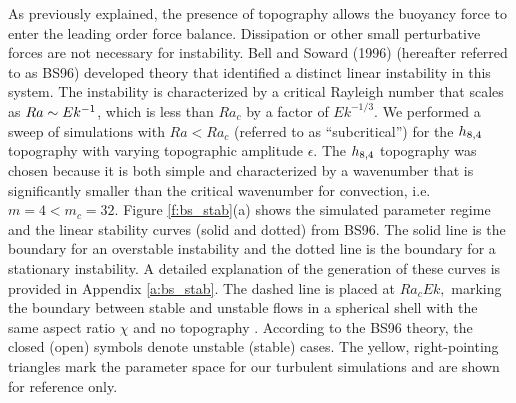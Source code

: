 As previously explained, the presence of topography allows the buoyancy force to enter the leading order force balance. 
Dissipation or other small perturbative forces are not necessary for instability. 
Bell and Soward (1996) \citep{pB96} (hereafter referred to as BS96) developed theory that identified a distinct linear instability in this system. 
The instability is characterized by a critical Rayleigh number that scales as $Ra\sim Ek^{-1}$, which is less than $Ra_c$ by a factor of $Ek^{-1/3}$. 
 We performed a sweep of simulations with $Ra <Ra_{c}$ (referred to as ``subcritical'') for the $h_{8,4}$ topography with varying topographic amplitude $\epsilon$. 
The $h_{8,4}$ topography was chosen because it is both simple and characterized by a wavenumber that is significantly smaller than the critical wavenumber for convection, i.e.~$m = 4 < m_{c} = 32$. 
Figure \ref{f:bs_stab}(a) shows the simulated parameter regime and the linear stability curves (solid and dotted) from BS96.
The solid line is the boundary for an overstable instability and the dotted line is the boundary for a stationary instability.
 A detailed explanation of the generation of these curves is provided in Appendix \ref{a:bs_stab}. 
 The dashed line is placed at $Ra_{c}Ek,$ marking the boundary between stable and unstable flows in a spherical shell with the same aspect ratio $\chi$ and no topography \citep{aB22}.
 According to the BS96 theory, the closed (open) symbols denote unstable (stable) cases. The yellow, right-pointing triangles mark the parameter space for our turbulent simulations and are shown for reference only.

